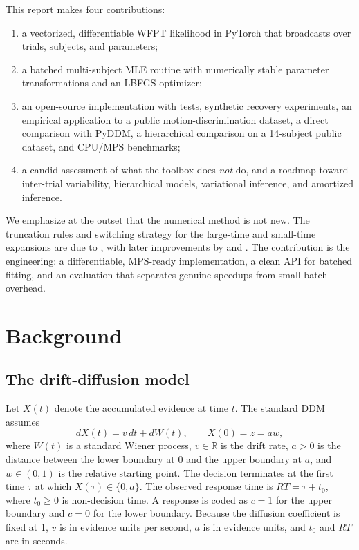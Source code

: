 \documentclass[11pt]{article}
\begin{document}
This report makes four contributions:
\begin{enumerate}
  \item a vectorized, differentiable WFPT likelihood in PyTorch that broadcasts over trials, subjects, and parameters;
  \item a batched multi-subject MLE routine with numerically stable parameter transformations and an LBFGS optimizer;
  \item an open-source implementation with tests, synthetic recovery experiments, an empirical application to a public motion-discrimination dataset, a direct comparison with PyDDM, a hierarchical comparison on a 14-subject public dataset, and CPU/MPS benchmarks;
  \item a candid assessment of what the toolbox does \emph{not} do, and a roadmap toward inter-trial variability, hierarchical models, variational inference, and amortized inference.
\end{enumerate}

We emphasize at the outset that the numerical method is not new. The truncation rules and switching strategy for the large-time and small-time expansions are due to \citet{NavarroFuss2009}, with later improvements by \citet{Gondan2014} and \citet{Blurton2017}. The contribution is the engineering: a differentiable, MPS-ready implementation, a clean API for batched fitting, and an evaluation that separates genuine speedups from small-batch overhead.

\section{Background}

\subsection{The drift-diffusion model}

Let $X(t)$ denote the accumulated evidence at time $t$. The standard DDM assumes
\begin{equation}
  dX(t) = v\,dt + dW(t), \qquad X(0)=z=aw,
  \label{eq:sde}
\end{equation}
where $W(t)$ is a standard Wiener process, $v\in\mathbb{R}$ is the drift rate, $a>0$ is the distance between the lower boundary at $0$ and the upper boundary at $a$, and $w\in(0,1)$ is the relative starting point. The decision terminates at the first time $\tau$ at which $X(\tau)\in\{0,a\}$. The observed response time is $RT=\tau+t_0$, where $t_0\ge 0$ is non-decision time. A response is coded as $c=1$ for the upper boundary and $c=0$ for the lower boundary. Because the diffusion coefficient is fixed at 1, $v$ is in evidence units per second, $a$ is in evidence units, and $t_0$ and $RT$ are in seconds.
\end{document}

